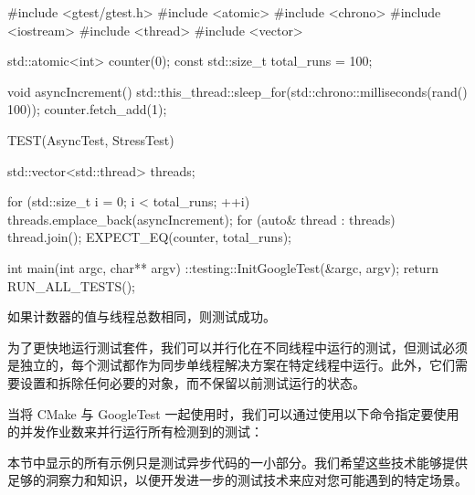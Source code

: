 \begin{cpp}
#include <gtest/gtest.h>
#include <atomic>
#include <chrono>
#include <iostream>
#include <thread>
#include <vector>

std::atomic<int> counter(0);
const std::size_t total_runs = 100;

void asyncIncrement() {
    std::this_thread::sleep_for(std::chrono::milliseconds(rand() %
    100));
    counter.fetch_add(1);
}

TEST(AsyncTest, StressTest) {
    std::vector<std::thread> threads;

    for (std::size_t i = 0; i < total_runs; ++i) {
        threads.emplace_back(asyncIncrement);
    }
    for (auto& thread : threads) {
        thread.join();
    }
    EXPECT_EQ(counter, total_runs);
}

int main(int argc, char** argv) {
    ::testing::InitGoogleTest(&argc, argv);
    return RUN_ALL_TESTS();
}
\end{cpp}

如果计数器的值与线程总数相同，则测试成功。


为了更快地运行测试套件，我们可以并行化在不同线程中运行的测试，但测试必须是独立的，每个测试都作为同步单线程解决方案在特定线程中运行。此外，它们需要设置和拆除任何必要的对象，而不保留以前测试运行的状态。

当将 CMake 与 GoogleTest 一起使用时，我们可以通过使用以下命令指定要使用的并发作业数来并行运行所有检测到的测试：


本节中显示的所有示例只是测试异步代码的一小部分。我们希望这些技术能够提供足够的洞察力和知识，以便开发进一步的测试技术来应对您可能遇到的特定场景。












